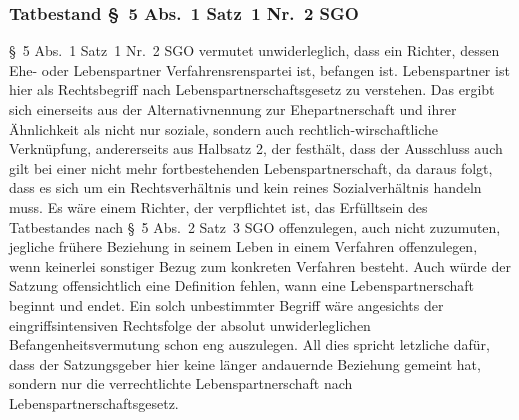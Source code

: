 \subsubsection{Tatbestand \S~5 Abs.~1 Satz~1 Nr.~2 SGO}
\label{Zusammensetzung:Spruchkoerper:Befangenheitsvermutung:Nr2}
\S~5 Abs.~1 Satz~1 Nr.~2 SGO vermutet unwiderleglich, dass ein Richter, dessen Ehe- oder Lebenspartner Verfahrensrenspartei ist, befangen ist.
Lebenspartner ist hier als Rechtsbegriff nach Lebenspartnerschaftsgesetz zu verstehen.
Das ergibt sich einerseits aus der Alternativnennung zur Ehepartnerschaft und ihrer Ähnlichkeit als nicht nur soziale, sondern auch rechtlich-wirschaftliche Verknüpfung, andererseits aus Halbsatz 2, der festhält, dass der Ausschluss auch gilt bei einer nicht mehr fortbestehenden Lebenspartnerschaft, da daraus folgt, dass es sich um ein Rechtsverhältnis und kein reines Sozialverhältnis handeln muss.
Es wäre einem Richter, der verpflichtet ist, das Erfülltsein des Tatbestandes nach \S~5 Abs.~2 Satz~3 SGO offenzulegen, auch nicht zuzumuten, jegliche frühere Beziehung in seinem Leben in einem Verfahren offenzulegen, wenn keinerlei sonstiger Bezug zum konkreten Verfahren besteht.
Auch würde der Satzung offensichtlich eine Definition fehlen, wann eine Lebenspartnerschaft beginnt und endet.
Ein solch unbestimmter Begriff wäre angesichts der eingriffsintensiven Rechtsfolge der absolut unwiderleglichen Befangenheitsvermutung schon eng auszulegen.
All dies spricht letzliche dafür, dass der Satzungsgeber hier keine länger andauernde Beziehung gemeint hat, sondern nur die verrechtlichte Lebenspartnerschaft nach Lebenspartnerschaftsgesetz.

